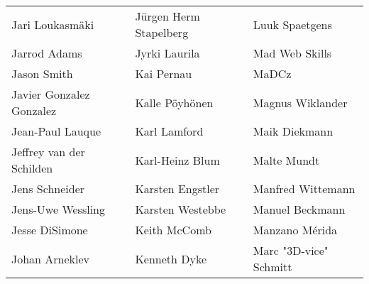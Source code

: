 \begin{tabular}{p{4.5cm}p{4.5cm}p{4.5cm}}
Jari Loukasmäki & Jürgen Herm Stapelberg & Luuk Spaetgens \\
Jarrod Adams & Jyrki Laurila & Mad Web Skills \\
Jason Smith & Kai Pernau & MaDCz \\
Javier Gonzalez Gonzalez & Kalle Pöyhönen & Magnus Wiklander \\
Jean-Paul Lauque & Karl Lamford & Maik Diekmann \\
Jeffrey van der Schilden & Karl-Heinz Blum & Malte Mundt \\
Jens Schneider & Karsten Engstler & Manfred Wittemann \\
Jens-Uwe Wessling & Karsten Westebbe & Manuel Beckmann \\
Jesse DiSimone & Keith McComb & Manzano Mérida \\
Johan Arneklev & Kenneth Dyke & Marc "3D-vice" Schmitt \\
\end{tabular}
\newpage
\setlength{\tabcolsep}{1mm}
